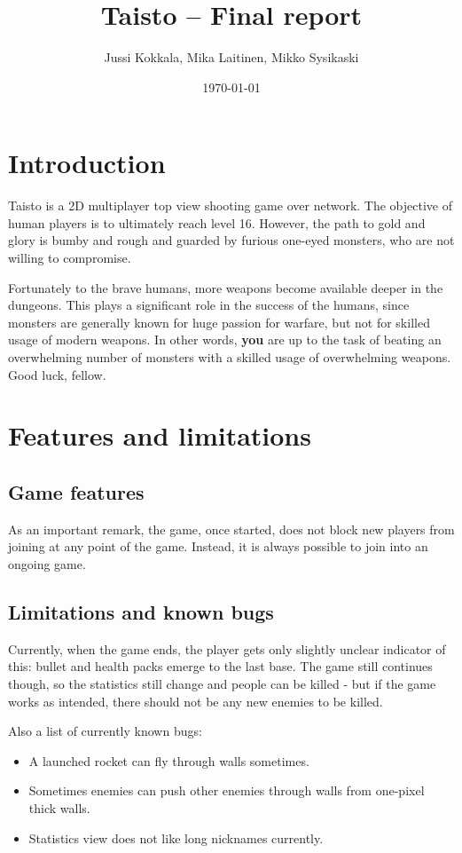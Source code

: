 \documentclass[a4paper,12pt,titlepage]{article}
\title{Taisto -- Final report}
\author{Jussi Kokkala, Mika Laitinen, Mikko Sysikaski}
\date{\today}
\begin{document}
\maketitle

\section{Introduction}
Taisto is a 2D multiplayer top view shooting game over network. The objective of human players is to ultimately reach level 16. However, the path to gold and glory is bumby and rough and guarded by furious one-eyed monsters, who are not willing to compromise. 

Fortunately to the brave humans, more weapons become available deeper in the dungeons. This plays a significant role in the success of the humans, since monsters are generally known for huge passion for warfare, but not for skilled usage of modern weapons. In other words, \textbf{you} are up to the task of beating an overwhelming number of monsters with a skilled usage of overwhelming weapons. Good luck, fellow.

\section{Features and limitations}

\subsection{Game features}

As an important remark, the game, once started, does not block new players from
joining at any point of the game. Instead, it is always possible to join into
an ongoing game.

\subsection {Limitations and known bugs}
Currently, when the game ends, the player gets only slightly unclear indicator
of this: bullet and health packs emerge to the last base. The game still
continues though, so the statistics still change and people can be killed - but
if the game works as intended, there should not be any new enemies to be killed.

Also a list of currently known bugs:
\begin{itemize}
\item A launched rocket can fly through walls sometimes.
\item Sometimes enemies can push other enemies through walls from one-pixel thick
walls.
\item Statistics view does not like long nicknames currently.
\end{itemize}
\end{document}
